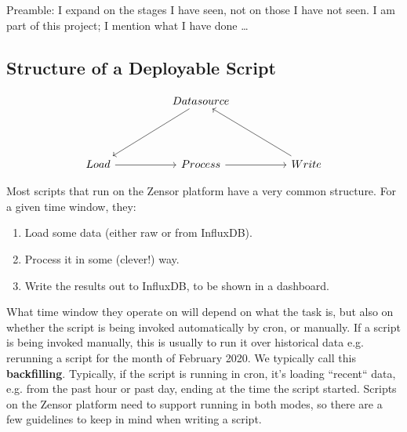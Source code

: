 Preamble: I expand on the stages I have seen, not on those I have not seen.
I am part of this project; I mention what I have done \dots

\subsection{Structure of a Deployable Script}\label{subsection:script_structure}
\[\begin{tikzcd}
		&& Datasource \\
		&& {} \\
		Load && Process && Write
		\arrow[from=3-1, to=3-3]
		\arrow[from=3-3, to=3-5]
		\arrow[from=1-3, to=3-1]
		\arrow[from=3-5, to=1-3]
	\end{tikzcd}\]

Most scripts that run on the Zensor platform have a very common structure. For a given time window, they:
\begin{enumerate}
	\item Load some data (either raw or from InfluxDB).
	\item Process it in some (clever!) way.
	\item Write the results out to InfluxDB, to be shown in a dashboard.
\end{enumerate}
What time window they operate on will depend on what the task is, but also on whether the script is being invoked automatically by cron, or manually.
If a script is being invoked manually, this is usually to run it over historical data e.g. rerunning a script for the month of February 2020. We typically call this \textbf{backfilling}.
Typically, if the script is running in cron, it's loading ``recent`` data, e.g. from the past hour or past day, ending at the time the script started.
Scripts on the Zensor platform need to support running in both modes, so there are a few guidelines to keep in mind when writing a script.

